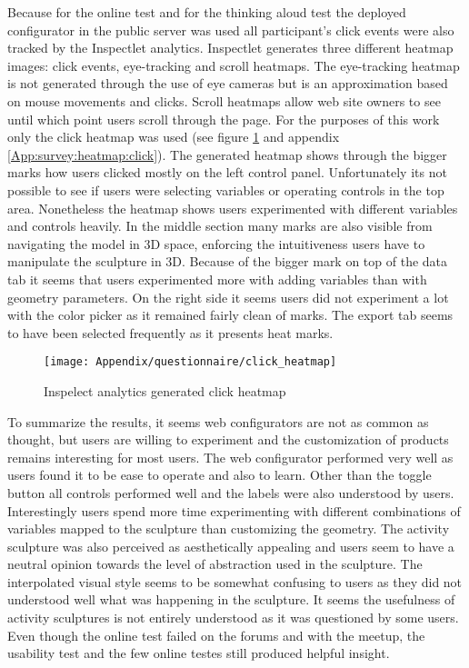 \documentclass[../medieninformatik-arbeit.tex]{subfiles}
\begin{document}
Because for the online test and for the thinking aloud test the deployed configurator in the public server was used all participant's click events were also tracked by the Inspectlet analytics. Inspectlet generates three different heatmap images: click events, eye-tracking and scroll heatmaps. The eye-tracking heatmap is not generated through the use of eye cameras but is an approximation based on mouse movements and clicks. Scroll heatmaps allow web site owners to see until which point users scroll through the page. For the purposes of this work only the click heatmap was used (see figure \ref{fig:heatmap} and appendix \ref{App:survey:heatmap:click}). The generated heatmap shows through the bigger marks how users clicked mostly on the left control panel. Unfortunately its not possible to see if users were selecting variables or operating controls in the top area. Nonetheless the heatmap shows users experimented with different variables and controls heavily. In the middle section many marks are also visible from navigating the model in 3D space, enforcing the intuitiveness users have to manipulate the sculpture in 3D. Because of the bigger mark on top of the data tab it seems that users experimented more with adding variables than with geometry parameters. On the right side it seems users did not experiment a lot with the color picker as it remained fairly clean of marks. The export tab seems to have been selected frequently as it presents heat marks.

\begin{figure}[h]
\captionsetup{width=\textwidth}
\begin{center}
  \texttt{[image: Appendix/questionnaire/click\_heatmap]}
  \caption{Inspelect analytics generated click heatmap}
\label{fig:heatmap}
\end{center}
\end{figure}

To summarize the results, it seems web configurators are not as common as thought, but users are willing to experiment and the customization of products remains interesting for most users. The web configurator performed very well as users found it to be ease to operate and also to learn. Other than the toggle button all controls performed well and the labels were also understood by users. Interestingly users spend more time experimenting with different combinations of variables mapped to the sculpture than customizing the geometry. The activity sculpture was also perceived as aesthetically appealing and users seem to have a neutral opinion towards the level of abstraction used in the sculpture. The interpolated visual style seems to be somewhat confusing to users as they did not understood well what was happening in the sculpture. It seems the usefulness of activity sculptures is not entirely understood as it was questioned by some users. Even though the online test failed on the forums and with the meetup, the usability test and the few online testes still produced helpful insight. 
\end{document}
